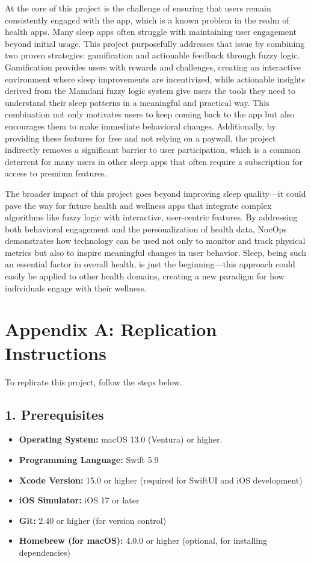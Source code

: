 \documentclass[10pt,twocolumn]{article}
\begin{document}
At the core of this project is the challenge of ensuring that users remain consistently engaged with the app, which is a known problem in the realm of health apps. Many sleep apps often struggle with maintaining user engagement beyond initial usage. This project purposefully addresses that issue by combining two proven strategies: gamification and actionable feedback through fuzzy logic. Gamification provides users with rewards and challenges, creating an interactive environment where sleep improvements are incentivized, while actionable insights derived from the Mamdani fuzzy logic system give users the tools they need to understand their sleep patterns in a meaningful and practical way. This combination not only motivates users to keep coming back to the app but also encourages them to make immediate behavioral changes. Additionally, by providing these features for free and not relying on a paywall, the project indirectly removes a significant barrier to user participation, which is a common deterrent for many users in other sleep apps that often require a subscription for access to premium features.

The broader impact of this project goes beyond improving sleep quality—it could pave the way for future health and wellness apps that integrate complex algorithms like fuzzy logic with interactive, user-centric features. By addressing both behavioral engagement and the personalization of health data, NocOps demonstrates how technology can be used not only to monitor and track physical metrics but also to inspire meaningful changes in user behavior. Sleep, being such an essential factor in overall health, is just the beginning—this approach could easily be applied to other health domains, creating a new paradigm for how individuals engage with their wellness.


\section*{Appendix A: Replication Instructions}

To replicate this project, follow the steps below.

\subsection*{1. Prerequisites}
\begin{itemize}
    \item \textbf{Operating System:} macOS 13.0 (Ventura) or higher.
    \item \textbf{Programming Language:} Swift 5.9
    \item \textbf{Xcode Version:} 15.0 or higher (required for SwiftUI and iOS development)
    \item \textbf{iOS Simulator:} iOS 17 or later
    \item \textbf{Git:} 2.40 or higher (for version control)
    \item \textbf{Homebrew (for macOS):} 4.0.0 or higher (optional, for installing dependencies)
\end{itemize}
\end{document}
